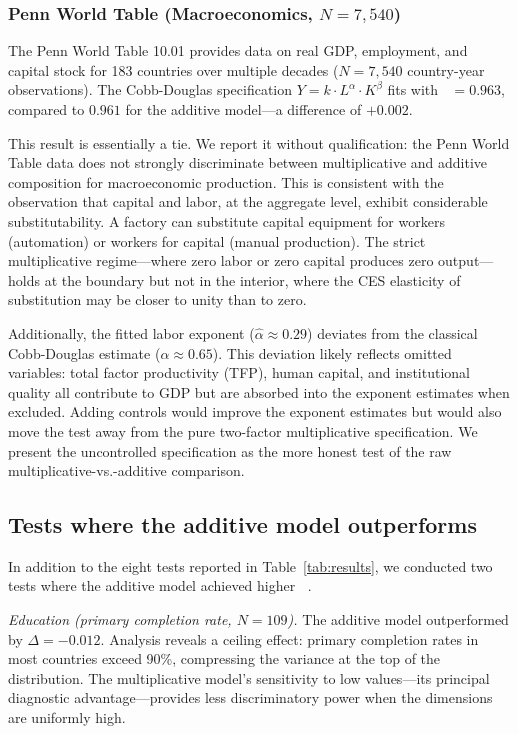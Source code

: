 \documentclass[12pt, a4paper]{article}
\theoremstyle{definition}
\theoremstyle{remark}
\DeclareMathOperator{\Spearman}{\rho_s}
\begin{document}
\subsubsection{Penn World Table (Macroeconomics, $N = 7{,}540$)}

The Penn World Table 10.01 \cite{feenstra2015} provides data on real GDP, employment, and capital stock for 183 countries over multiple decades ($N = 7{,}540$ country-year observations). The Cobb-Douglas specification $Y = k \cdot L^\alpha \cdot K^\beta$ fits with $\Spearman = 0.963$, compared to $0.961$ for the additive model---a difference of $+0.002$.

This result is essentially a tie. We report it without qualification: the Penn World Table data does not strongly discriminate between multiplicative and additive composition for macroeconomic production. This is consistent with the observation that capital and labor, at the aggregate level, exhibit considerable substitutability. A factory can substitute capital equipment for workers (automation) or workers for capital (manual production). The strict multiplicative regime---where zero labor or zero capital produces zero output---holds at the boundary but not in the interior, where the CES elasticity of substitution may be closer to unity than to zero.

Additionally, the fitted labor exponent ($\hat{\alpha} \approx 0.29$) deviates from the classical Cobb-Douglas estimate ($\alpha \approx 0.65$). This deviation likely reflects omitted variables: total factor productivity (TFP), human capital, and institutional quality all contribute to GDP but are absorbed into the exponent estimates when excluded. Adding controls would improve the exponent estimates but would also move the test away from the pure two-factor multiplicative specification. We present the uncontrolled specification as the more honest test of the raw multiplicative-vs.-additive comparison.

\subsection{Tests where the additive model outperforms}

In addition to the eight tests reported in Table~\ref{tab:results}, we conducted two tests where the additive model achieved higher $\Spearman$.

\textit{Education (primary completion rate, $N = 109$).} The additive model outperformed by $\Delta = -0.012$. Analysis reveals a ceiling effect: primary completion rates in most countries exceed 90\%, compressing the variance at the top of the distribution. The multiplicative model's sensitivity to low values---its principal diagnostic advantage---provides less discriminatory power when the dimensions are uniformly high.
\end{document}

